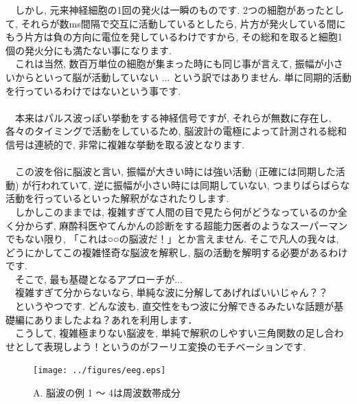 \documentclass[11pt,a4paper]{ujreport} 	%
\begin{document}
　しかし, 元来神経細胞の1回の発火は一瞬のものです. 2つの細胞があったとして, それらが数ms間隔で交互に活動しているとしたら, 片方が発火している間にもう片方は負の方向に電位を発しているわけですから, その総和を取ると細胞1個の発火分にも満たない事になります. \\
　これは当然, 数百万単位の細胞が集まった時にも同じ事が言えて, 振幅が小さいからといって脳が活動していない ... という訳ではありません. 単に同期的活動を行っているわけではないという事です.\\
\\
　本来はパルス波っぽい挙動をする神経信号ですが, それらが無数に存在し, 各々のタイミングで活動をしているため, 脳波計の電極によって計測される総和信号は連続的で, 非常に複雑な挙動を取る波となります. \\
\\
　この波を俗に脳波と言い, 振幅が大きい時には強い活動 (正確には同期した活動) が行われていて, 逆に振幅が小さい時には同期していない, つまりばらばらな活動を行っているといった解釈がなされたりします. \\
　しかしこのままでは, 複雑すぎて人間の目で見たら何がどうなっているのか全く分からず, 麻酔科医やてんかんの診断をする超能力医者のようなスーパーマンでもない限り, 「これは○○の脳波だ！」とか言えません. そこで凡人の我々は, どうにかしてこの複雑怪奇な脳波を解釈し, 脳の活動を解明する必要があるわけです.\\

　そこで, 最も基礎となるアプローチが...\\
　複雑すぎて分からないなら, 単純な波に分解してあげればいいじゃん？？\\ 
　というやつです. どんな波も, 直交性をもつ波に分解できるみたいな話題が基礎編にありましたよね？あれを利用します．
\\
　こうして, 複雑極まりない脳波を, 単純で解釈のしやすい三角関数の足し合わせとして表現しよう！というのがフーリエ変換のモチベーションです.\\

\begin{figure}[H]
\label{im:eeg}
  \centering
  \texttt{[image: ../figures/eeg.eps]}
  \caption{A. 脳波の例 1 ～ 4は周波数帯成分}
\end{figure}
\end{document}
